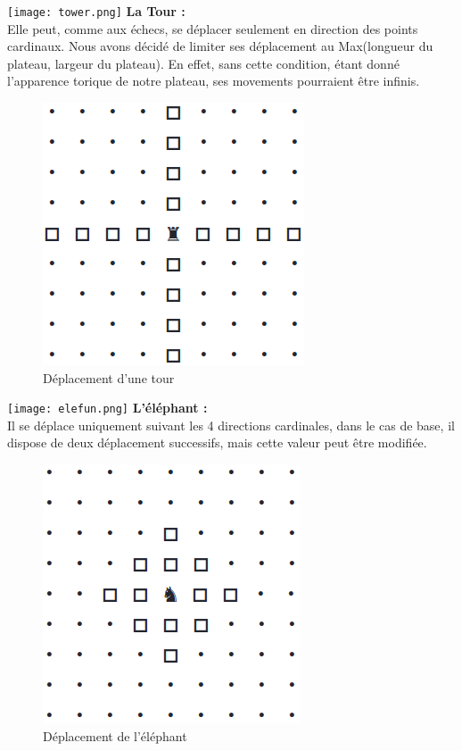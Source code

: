         \texttt{[image: tower.png]} \textbf{La Tour :}\label{part:tower} \\
        Elle peut, comme aux échecs, se déplacer seulement en direction des points cardinaux. Nous avons décidé de limiter ses déplacement au Max(longueur du plateau, largeur du plateau). En effet, sans cette condition, étant donné l'apparence torique de notre plateau, ses movements pourraient être infinis.
        \medbreak
             \begin{figure}[H]
                \centering
                \includegraphics[scale=0.3]{img/dep_tower.png}
                \caption{Déplacement d'une tour}
                \label{fig:dep_tower}
            \end{figure}
        \texttt{[image: elefun.png]} \textbf{L'éléphant :} \\
        Il se déplace uniquement suivant les 4 directions cardinales, dans le cas de base, il dispose de deux déplacement successifs, mais cette valeur peut être modifiée.
        \medbreak
            \begin{figure}[H]
                \centering
                \includegraphics[scale=0.3]{img/dep_elefun.png}
                \caption{Déplacement de l'éléphant}
                \label{fig:dep_éléfun}
            \end{figure}
            
